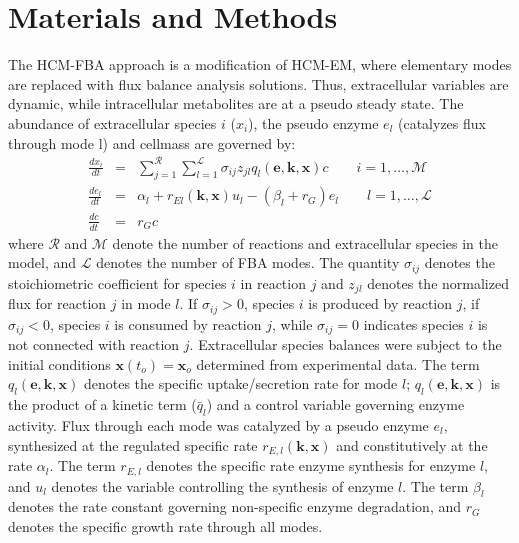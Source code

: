 \documentclass[10pt,twocolumn,twoside,final]{IEEEtran}
\begin{document}
\section{Materials and Methods}
The HCM-FBA approach is a modification of HCM-EM, where elementary modes are replaced with flux balance analysis solutions.
Thus, extracellular variables are dynamic, while intracellular metabolites are at a pseudo steady state.
The abundance of extracellular species $i$ ($x_{i}$), the pseudo enzyme $e_{l}$ (catalyzes flux through mode l) and cellmass are governed by:
\begin{eqnarray}\nonumber
	\frac{dx_{i}}{dt}  & = &  \sum_{j = 1}^{\mathcal{R}}\sum_{l = 1}^{\mathcal{L}}\sigma_{ij}z_{jl}q_{l}\left(\mathbf{e},\mathbf{k},\mathbf{x}\right)c \qquad{i=1,\hdots,\mathcal{M}}\\\nonumber
  \frac{de_{l}}{dt}  & = & \alpha_{l} + r_{El}\left(\mathbf{k},\mathbf{x}\right)u_{l} - \left(\beta_{l}+r_{G}\right)e_{l} \qquad l=1,\hdots,\mathcal{L} \\\nonumber
  \frac{dc}{dt} & = & r_{G}c
\end{eqnarray}
where $\mathcal{R}$ and $\mathcal{M}$ denote the number of reactions and extracellular species in the model, and $\mathcal{L}$ denotes the number of FBA modes.
The quantity $\sigma_{ij}$ denotes the stoichiometric coefficient for species $i$ in reaction $j$ and $z_{jl}$ denotes the normalized flux for reaction $j$ in mode $l$.
If $\sigma_{ij}>0$, species $i$ is produced by reaction $j$,
if $\sigma_{ij}<0$, species $i$ is consumed by reaction $j$, while $\sigma_{ij} = 0$ indicates species $i$ is not connected with reaction $j$.
Extracellular species balances were subject to the initial conditions $\mathbf{x}\left(t_{o}\right) = \mathbf{x}_{o}$ determined from experimental data.
The term $q_{l}\left(\mathbf{e},\mathbf{k},\mathbf{x}\right)$ denotes the specific uptake/secretion rate for mode $l$;
$q_{l}\left(\mathbf{e},\mathbf{k},\mathbf{x}\right)$ is the product of a kinetic term ($\bar{q}_{l}$) and a control variable governing enzyme activity.
Flux through each mode was catalyzed by a pseudo enzyme $e_{l}$, synthesized at the regulated specific rate $r_{E,l}\left(\mathbf{k},\mathbf{x}\right)$ and constitutively at the rate $\alpha_{l}$.
The term $r_{E,l}$ denotes the specific rate enzyme synthesis for enzyme $l$, and $u_{l}$ denotes the variable controlling the synthesis of enzyme $l$.
The term $\beta_{l}$ denotes the rate constant governing non-specific enzyme degradation, and $r_{G}$ denotes the specific growth rate through all modes.
\end{document}
